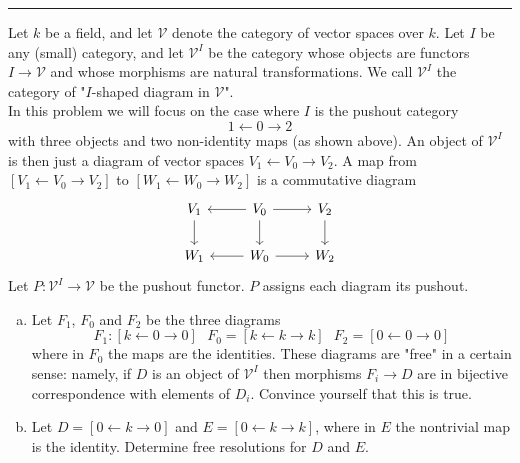 \documentclass[a4paper, 12pt]{article}
\begin{document}
\noindent\rule{7in}{2.8pt}
\begin{problem}{6}
Let \(k\) be a field, and let \(\mathcal{V}\) denote the category of vector spaces over \(k\). Let \(I\) be any (small) category, and let \(\mathcal{V}^I\) be the category whose objects are functors \(I\rightarrow \mathcal{V}\) and whose morphisms are 
natural transformations. We call \(\mathcal{V}^I\) the category of "\(I\)-shaped diagram in \(\mathcal{V}\)". \\ 
In this problem we will focus on the case where \(I\) is the pushout category 
\[1\leftarrow 0\rightarrow 2\]
with three objects and two non-identity maps (as shown above). An object of \(\mathcal{V}^I\) is then just a diagram of vector spaces \(V_1\leftarrow V_0\rightarrow V_2\). A map from \([V_1\leftarrow V_0\rightarrow V_2]\) to \([W_1\leftarrow W_0\rightarrow W_2]\) 
is a commutative diagram 
\[\begin{tikzcd}
	{V_1} & {V_0} & {V_2} \\
	{W_1} & {W_0} & {W_2}
	\arrow[from=1-1, to=2-1]
	\arrow[from=1-2, to=1-1]
	\arrow[from=1-2, to=1-3]
	\arrow[from=1-2, to=2-2]
	\arrow[from=1-3, to=2-3]
	\arrow[from=2-2, to=2-1]
	\arrow[from=2-2, to=2-3]
\end{tikzcd}\]
Let \(P:\mathcal{V}^I\rightarrow \mathcal{V}\) be the pushout functor. \(P\) assigns each diagram its pushout.
\begin{enumerate}[(a)]
\item Let \(F_1\), \(F_0\) and \(F_2\) be the three diagrams 
\[F_1:[k\leftarrow 0\rightarrow 0]\ \ \ F_0=[k\leftarrow k\rightarrow k]\ \ \ F_2=[0\leftarrow 0\rightarrow 0]\]
where in \(F_0\) the maps are the identities. These diagrams are "free" in a certain sense: namely, if \(D\) is an object of \(\mathcal{V}^I\) then morphisms \(F_i\rightarrow D\) are in bijective correspondence with elements of \(D_i\). 
Convince yourself that this is true. 
\item Let \(D=[0\leftarrow k\rightarrow 0]\) and \(E=[0\leftarrow k\rightarrow k]\), where in \(E\) the nontrivial map is the identity. Determine free resolutions for \(D\) and \(E\). 

\end{enumerate}
\end{problem}
\end{document}
